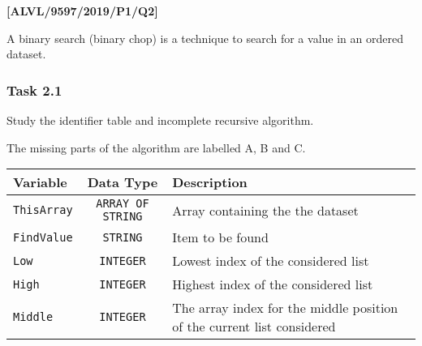 \item \textbf{{[}ALVL/9597/2019/P1/Q2{]} }

A binary search (binary chop) is a technique to search for a value
in an ordered dataset.

\subsubsection*{Task 2.1}

Study the identifier table and incomplete recursive algorithm. 

The missing parts of the algorithm are labelled A, B and C.
\begin{center}
\begin{tabular}{|l|c|l|}
\hline 
\texttt{\hspace{0.01\columnwidth}}Variable & \texttt{\hspace{0.01\columnwidth}}Data Type & \texttt{\hspace{0.05\columnwidth}}Description\tabularnewline
\hline 
\texttt{ThisArray} & \texttt{ARRAY OF STRING} & Array containing the the dataset\tabularnewline
\hline 
\texttt{FindValue} & \texttt{STRING} & Item to be found\tabularnewline
\hline 
\texttt{Low} & \texttt{INTEGER} & Lowest index of the considered list\tabularnewline
\hline 
\texttt{High} & \texttt{INTEGER} & Highest index of the considered list\tabularnewline
\hline 
\texttt{Middle} & \texttt{INTEGER} & The array index for the middle position of the current list considered\tabularnewline
\hline 
\end{tabular}
\par\end{center}

